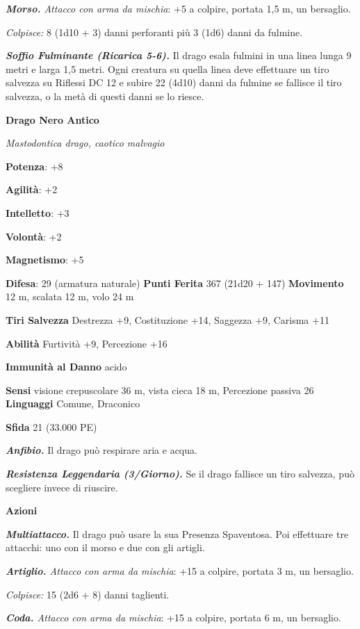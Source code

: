 \begin{multicols}{2}
\emph{\textbf{Morso.} Attacco con arma da mischia}: +5 a colpire,
portata 1,5 m, un bersaglio.

\emph{Colpisce:} 8 (1d10 + 3) danni perforanti più 3 (1d6) danni da
fulmine.

\emph{\textbf{Soffio Fulminante (Ricarica 5-6).}} Il drago esala fulmini
in una linea lunga 9 metri e larga 1,5 metri. Ogni creatura su quella
linea deve effettuare un tiro salvezza su Riflessi DC 12 e subire 22
(4d10) danni da fulmine se fallisce il tiro salvezza, o la metà di
questi danni se lo riesce.

\textbf{Drago Nero Antico}

\emph{Mastodontica drago, caotico malvagio}

\textbf{Potenza}: +8

\textbf{Agilità}: +2

\textbf{Intelletto}: +3

\textbf{Volontà}: +2

\textbf{Magnetismo}: +5

\textbf{Difesa}: 29 (armatura naturale) \textbf{Punti Ferita}
367 (21d20 + 147) \textbf{Movimento} 12 m, scalata 12 m, volo 24 m

\textbf{Tiri Salvezza} Destrezza +9, Costituzione +14, Saggezza +9,
Carisma +11

\textbf{Abilità} Furtività +9, Percezione +16

\textbf{Immunità al Danno} acido

\textbf{Sensi} visione crepuscolare 36 m, vista cieca 18 m, Percezione passiva
26 \textbf{Linguaggi} Comune, Draconico

\textbf{Sfida} 21 (33.000 PE)

\emph{\textbf{Anfibio.}} Il drago può respirare aria e acqua.

\emph{\textbf{Resistenza Leggendaria (3/Giorno).}} Se il drago fallisce
un tiro salvezza, può scegliere invece di riuscire.

\textbf{Azioni}

\emph{\textbf{Multiattacco.}} Il drago può usare la sua Presenza
Spaventosa. Poi effettuare tre attacchi: uno con il morso e due con gli
artigli.

\emph{\textbf{Artiglio.} Attacco con arma da mischia}: +15 a colpire,
portata 3 m, un bersaglio.

\emph{Colpisce:} 15 (2d6 + 8) danni taglienti.

\emph{\textbf{Coda.} Attacco con arma da mischia}: +15 a colpire,
portata 6 m, un bersaglio.


\end{multicols}
